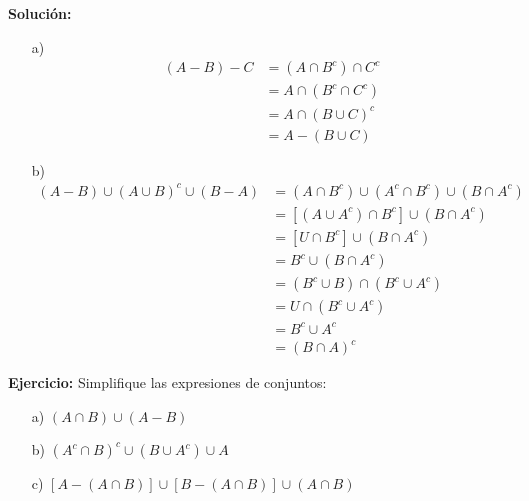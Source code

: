 \documentclass[a4paper,10pt]{article}
\begin{document}
\textbf{Solución:}

    \begin{enumerate}
        \item[a)]
            \begin{align*}
                (A-B)-C &= (A\cap B^c) \cap C^c \\
                        &= A \cap (B^c \cap C^c) \\
                        &= A \cap (B \cup C)^c \\
                        &= A-(B\cup C)
            \end{align*}
            \newpage



        \item[b)]
            \begin{align*}
                (A-B)\cup(A\cup B)^c\cup(B-A) &= (A\cap B^c)\cup(A^c \cap B^c)\cup(B\cap A^c) \\
                                              &= \left[ (A \cup A^c) \cap B^c \right] \cup (B \cap A^c) \\
                                              &= \left[ U \cap B^c \right] \cup (B \cap A^c) \\
                                              &= B^c \cup (B \cap A^c) \\
                                              &= (B^c \cup B) \cap (B^c \cup A^c) \\
                                              &= U \cap (B^c \cup A^c) \\
                                              &= B^c \cup A^c \\
                                              &= (B \cap A)^c
            \end{align*}
    \end{enumerate}
    \vspace{5mm}







\textbf{Ejercicio:} Simplifique las expresiones de conjuntos:
        \begin{enumerate}
            \item[a)] $ (A \cap B)\cup(A-B)$
            \item[b)] $ (A^c \cap B)^c \cup (B \cup A^c) \cup A$
            \item[c)] $ [A-(A \cap B)] \cup [B-(A \cap B)] \cup (A \cap B)$
        \end{enumerate}
\end{document}
